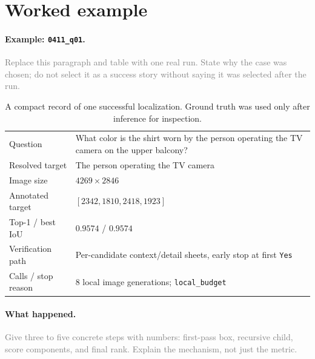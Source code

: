 \documentclass[11pt]{article}
\newcommand{\ph}[1]{\textcolor{gray}{#1}}   %
\begin{document}
\section{Worked example}

\paragraph{Example: \texttt{0411\_q01}.}
\ph{Replace this paragraph and table with one real run. State why the case was
chosen; do not select it as a success story without saying it was selected after
the run.}

\begin{table}[h]
\centering
\small
\begin{tabularx}{\textwidth}{@{}l X@{}}
\toprule
Question & What color is the shirt worn by the person operating the TV camera on the upper balcony? \\
Resolved target & The person operating the TV camera \\
Image size & $4269 \times 2846$ \\
Annotated target & $[2342, 1810, 2418, 1923]$ \\
Top-1 / best IoU & $0.9574$ / $0.9574$ \\
Verification path & Per-candidate context/detail sheets, early stop at first \texttt{Yes} \\
Calls / stop reason & 8 local image generations; \texttt{local\_budget} \\
\bottomrule
\end{tabularx}
\caption{A compact record of one successful localization. Ground truth was used
only after inference for inspection.}
\label{tab:example}
\end{table}

\paragraph{What happened.}
\ph{Give three to five concrete steps with numbers: first-pass box, recursive
child, score components, and final rank. Explain the mechanism, not just the
metric.}
\end{document}

